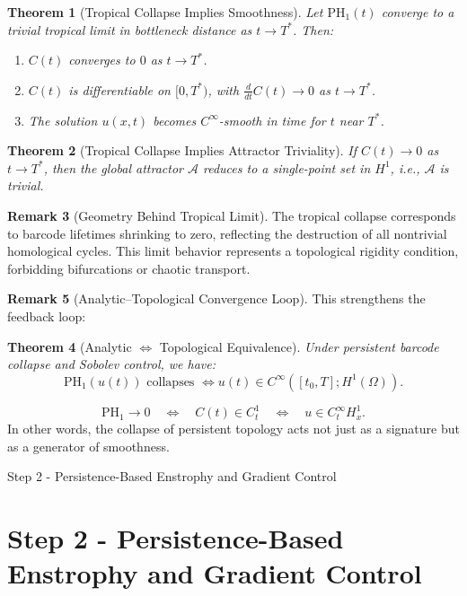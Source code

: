 \documentclass[11pt]{article}
\newtheorem{theorem}{Theorem}[section]
\theoremstyle{definition}
\newtheorem{remark}[theorem]{Remark}
\begin{document}
\begin{theorem}[Tropical Collapse Implies Smoothness]
Let $\mathrm{PH}_1(t)$ converge to a trivial tropical limit in bottleneck distance as $t \to T^*$. Then:
\begin{enumerate}
  \item $C(t)$ converges to $0$ as $t \to T^*$.
  \item $C(t)$ is differentiable on $[0,T^*)$, with $\frac{d}{dt} C(t) \to 0$ as $t \to T^*$.
  \item The solution $u(x,t)$ becomes $C^\infty$-smooth in time for $t$ near $T^*$.
\end{enumerate}
\end{theorem}

\begin{theorem}[Tropical Collapse Implies Attractor Triviality]
If $C(t) \to 0$ as $t \to T^*$, then the global attractor $\mathcal{A}$ reduces to a single-point set in $H^1$, i.e., $\mathcal{A}$ is trivial.
\end{theorem}

\begin{remark}[Geometry Behind Tropical Limit]
The tropical collapse corresponds to barcode lifetimes shrinking to zero, reflecting the destruction of all nontrivial homological cycles. This limit behavior represents a topological rigidity condition, forbidding bifurcations or chaotic transport.
\end{remark}

\begin{remark}[Analytic–Topological Convergence Loop]
This strengthens the feedback loop:

\begin{theorem}[Analytic $\Leftrightarrow$ Topological Equivalence]
Under persistent barcode collapse and Sobolev control, we have:
\[
\mathrm{PH}_1(u(t)) \text{ collapses } \Longleftrightarrow u(t) \in C^\infty([t_0,T]; H^1(\Omega)).
\]
\end{theorem}
\[
\mathrm{PH}_1 \to 0 \quad \Longleftrightarrow \quad C(t) \in C^1_t \quad \Longleftrightarrow \quad u \in C^\infty_t H^1_x.
\]
In other words, the collapse of persistent topology acts not just as a signature but as a generator of smoothness.
\end{remark}



Step 2 - Persistence-Based Enstrophy and Gradient Control
\section{Step 2 - Persistence-Based Enstrophy and Gradient Control}
\end{document}
